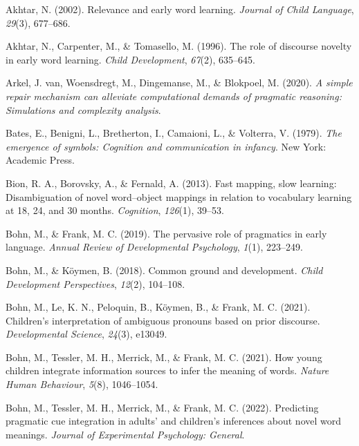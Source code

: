 \documentclass[
  man,floatsintext]{apa6}
\newlength{\cslhangindent}
\newlength{\cslentryspacingunit} %
\newenvironment{CSLReferences}[2] %
 {%
  \setlength{\parindent}{0pt}
  \ifodd #1
  \let\oldpar\par
  \def\par{\hangindent=\cslhangindent\oldpar}
  \fi
  \setlength{\parskip}{#2\cslentryspacingunit}
 }%
 {}
\begin{document}
\hypertarget{refs}{}
\begin{CSLReferences}{1}{0}
\leavevmode{}%
Akhtar, N. (2002). Relevance and early word learning. \emph{Journal of Child Language}, \emph{29}(3), 677--686.

\leavevmode{}%
Akhtar, N., Carpenter, M., \& Tomasello, M. (1996). The role of discourse novelty in early word learning. \emph{Child Development}, \emph{67}(2), 635--645.

\leavevmode{}%
Arkel, J. van, Woensdregt, M., Dingemanse, M., \& Blokpoel, M. (2020). \emph{A simple repair mechanism can alleviate computational demands of pragmatic reasoning: Simulations and complexity analysis}.

\leavevmode{}%
Bates, E., Benigni, L., Bretherton, I., Camaioni, L., \& Volterra, V. (1979). \emph{The emergence of symbols: Cognition and communication in infancy}. New York: Academic Press.

\leavevmode{}%
Bion, R. A., Borovsky, A., \& Fernald, A. (2013). Fast mapping, slow learning: Disambiguation of novel word--object mappings in relation to vocabulary learning at 18, 24, and 30 months. \emph{Cognition}, \emph{126}(1), 39--53.

\leavevmode{}%
Bohn, M., \& Frank, M. C. (2019). The pervasive role of pragmatics in early language. \emph{Annual Review of Developmental Psychology}, \emph{1}(1), 223--249.

\leavevmode{}%
Bohn, M., \& Köymen, B. (2018). Common ground and development. \emph{Child Development Perspectives}, \emph{12}(2), 104--108.

\leavevmode{}%
Bohn, M., Le, K. N., Peloquin, B., Köymen, B., \& Frank, M. C. (2021). Children's interpretation of ambiguous pronouns based on prior discourse. \emph{Developmental Science}, \emph{24}(3), e13049.

\leavevmode{}%
Bohn, M., Tessler, M. H., Merrick, M., \& Frank, M. C. (2021). How young children integrate information sources to infer the meaning of words. \emph{Nature Human Behaviour}, \emph{5}(8), 1046--1054.

\leavevmode{}%
Bohn, M., Tessler, M. H., Merrick, M., \& Frank, M. C. (2022). Predicting pragmatic cue integration in adults' and children's inferences about novel word meanings. \emph{Journal of Experimental Psychology: General}.


\end{CSLReferences}
\end{document}
